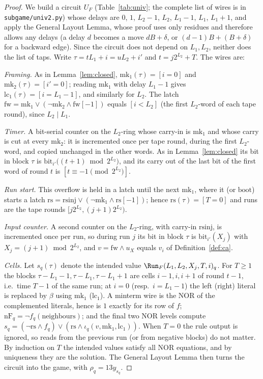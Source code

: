 \begin{proof}
We build a circuit $U_F$ (Table~\ref{tab:univ}; the complete list of wires is in
\texttt{subgame/univ2.py}) whose delays are $0$, $1$, $L_2-1$, $L_2$, $L_1-1$, $L_1$, $L_1+1$, and apply
the General Layout Lemma, whose proof uses only residues and therefore allows any delays (a delay
$d$ becomes a move $dB+\delta$, or $(d-1)B+(B+\delta)$ for a backward edge).  Since the circuit does not
depend on $L_1,L_2$, neither does the list of taps.  Write $\tau=tL_1+i=uL_2+i'$ and
$t=j2^{L_2}+T$.  The wires are:

\emph{Framing.}  As in Lemma~\ref{lem:closed}, $\mathrm{mk}_1(\tau)=[i=0]$ and
$\mathrm{mk}_2(\tau)=[i'=0]$; reading $\mathrm{mk}_1$ with delay $L_1-1$ gives $\mathrm{lc}_1(\tau)=[i=L_1-1]$, and
similarly for $L_2$.  The latch $\mathrm{fw}=\mathrm{mk}_1\vee(\neg\mathrm{mk}_2\wedge\mathrm{fw}[-1])$ equals
$[i<L_2]$ (the first $L_2$-word of each tape round), since $L_2\mid L_1$.

\emph{Timer.}  A bit-serial counter on the $L_2$-ring whose carry-in is $\mathrm{mk}_1$ and whose
carry is cut at every $\mathrm{mk}_2$: it is incremented once per tape round, during the first
$L_2$-word, and copied unchanged in the other words.  As in Lemma~\ref{lem:closed} its bit in block
$\tau$ is $\mathrm{bit}_{i'}\bigl((t+1)\bmod 2^{L_2}\bigr)$, and its carry out of the last bit of the first word of
round $t$ is $[t\equiv-1\pmod{2^{L_2}}]$.

\emph{Run start.}  This overflow is held in a latch until the next $\mathrm{mk}_1$, where it (or
$\mathrm{boot}$) starts a latch $\mathrm{rs}=\mathrm{rsinj}\vee(\neg\mathrm{mk}_1\wedge\mathrm{rs}[-1])$;
hence $\mathrm{rs}(\tau)=[T=0]$ and runs are the tape rounds $[j2^{L_2},(j+1)2^{L_2})$.

\emph{Input counter.}  A second counter on the $L_2$-ring, with carry-in $\mathrm{rsinj}$, is
incremented once per run, so during run $j$ its bit in block $\tau$ is $\mathrm{bit}_{i'}(X_j)$ with
$X_j=(j+1)\bmod 2^{L_2}$, and $v=\mathrm{fw}\wedge u_X$ equals $v_i$ of Definition~\ref{def:ca}.

\emph{Cells.}  Let $s_q(\tau)$ denote the intended value $\Run_F(L_1,L_2,X_j,T,i)_q$.  For $T\ge1$ the
blocks $\tau-L_1-1,\tau-L_1,\tau-L_1+1$ are cells $i-1,i,i+1$ of round $t-1$, i.e.\ time $T-1$ of the same
run; at $i=0$ (resp.\ $i=L_1-1$) the left (right) literal is replaced by $\beta$ using $\mathrm{mk}_1$
($\mathrm{lc}_1$).  A minterm wire is the NOR of the complemented literals, hence is $1$ exactly for its row
of $f$; $\mathrm{nF}_q=\neg f_q(\text{neighbours})$; and the final two NOR levels compute
$s_q=(\neg\mathrm{rs}\wedge f_q)\vee(\mathrm{rs}\wedge\iota_q(v,\mathrm{mk}_1,\mathrm{lc}_1))$.  When
$T=0$ the rule output is ignored, so reads from the previous run (or from negative blocks) do not
matter.  By induction on $T$ the intended values satisfy all NOR equations, and by uniqueness they are
the solution.  The General Layout Lemma then turns the circuit into the game, with
$\rho_q=13y_{s_q}$.
\end{proof}

